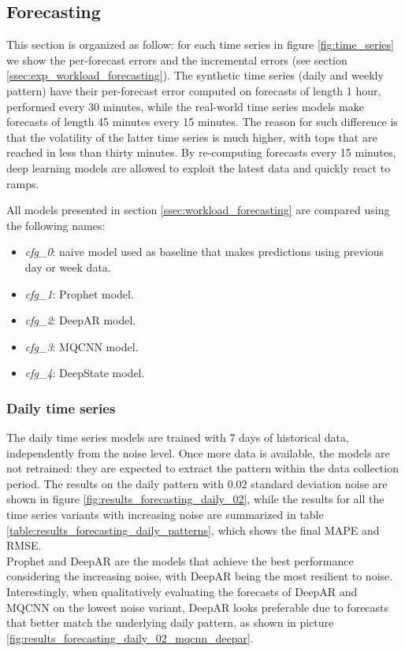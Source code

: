 \documentclass[a4paper, 12pt]{article} %
\begin{document}
	\clearpage
	\subsection{Forecasting} \label{ssec:results_forecasting}
	This section is organized as follow: for each time series in figure \ref{fig:time_series} we show the per-forecast errors and the incremental errors (see section \ref{ssec:exp_workload_forecasting}). 
	The synthetic time series (daily and weekly pattern) have their per-forecast error computed on forecasts of length 1 hour, performed every 30 minutes, while the real-world time series models make forecasts of length 45 minutes every 15 minutes. The reason for such difference is that the volatility of the latter time series is much higher, with tops that are reached in less than thirty minutes. By re-computing forecasts every 15 minutes, deep learning models are allowed to exploit the latest data and quickly react to ramps.
	
	All models presented in section \ref{ssec:workload_forecasting} are compared using the following names:
	\begin{itemize}
		\item \textit{cfg\_0}: naive model used as baseline that makes predictions using previous day or week data.
		\item \textit{cfg\_1}: Prophet model.
		\item \textit{cfg\_2}: DeepAR model.
		\item \textit{cfg\_3}: MQCNN model.
		\item \textit{cfg\_4}: DeepState model.
	\end{itemize}
	
	\subsubsection{Daily time series} \label{sssec:results_forecasting_daily}
	The daily time series models are trained with 7 days of historical data, independently from the noise level. Once more data is available, the models are not retrained: they are expected to extract the pattern within the data collection period.  The results on the daily pattern with $0.02$ standard deviation noise are shown in figure \ref{fig:results_forecasting_daily_02}, while the results for all the time series variants with increasing noise are summarized in table \ref{table:results_forecasting_daily_patterns}, which shows the final MAPE and RMSE.\\ 
	Prophet and DeepAR are the models that achieve the best performance considering the increasing noise, with DeepAR being the most resilient to noise. Interestingly, when qualitatively evaluating the forecasts of DeepAR and MQCNN on the lowest noise variant, DeepAR looks preferable due to forecasts that better match the underlying daily pattern, as shown in picture \ref{fig:results_forecasting_daily_02_mqcnn_deepar}. 
	
\end{document}
